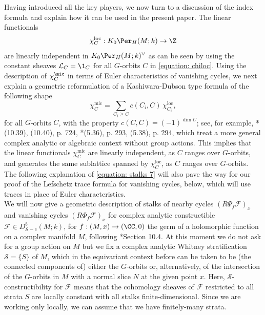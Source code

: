 \documentclass[11pt,letterpaper]{amsart}
\numberwithin{equation}{section}
\begin{document}
Having introduced all the key players, we now turn to a discussion of the index formula and explain how it can be used in the present paper.
The linear functionals $$\chi^{\textrm{loc}}_C : K_0 \Per_{H}(M;k) \to \Z$$ are linearly independent in $K_0 \Per_{H}(M;k)^\vee$  as can be seen by using the constant sheaves $\mathcal{L}_C = \1_{C}$ for all $G$-orbits $C$ in \eqref{equation: chiloc}.
Using the description of $\chi^\mic_C$ in terms of Euler characteristics of vanishing cycles, we next explain a geometric reformulation of a Kashiwara-Dubson type formula of the following shape 
\begin{equation}\label{equation: stalks 7}
\chi^\textrm{mic}_C = \sum_{C_i \geq C} c(C_i,C)\, \chi^\textrm{loc}_{C_i},
\end{equation}
for all $G$-orbits $C$, with the property $c(C,C) = (-1)^{\dim C}$; see, for example, \cite{MS22}*{(10.39), (10.40), p. 724}, \cite{Sch03}*{(5.36), p. 293, (5.38), p. 294}, which treat a more general complex analytic or algebraic context without group actions. 
This implies that the linear functionals $\chi^\textrm{mic}_C$ are linearly independent, as $C$ ranges over $G$-orbits, and generates the same sublattice spanned by $\chi^\textrm{loc}_C$, as $C$ ranges over $G$-orbits.
The following explanation of \ref{equation: stalks 7} will also pave the way for our proof of the Lefschetz trace formula for vanishing cycles, below, which will use traces in place of Euler characteristics.\\


We will now give a geometric description of stalks of nearby cycles $(R\Psi_f \mathcal{F})_x$ and vanishing cycles $(R\Phi_f \mathcal{F})_x$ for complex analytic constructible $\mathcal{F}\in D^b_{\mathscr{S}-c}(M;k)$, for $f: (M,x) \to (\CC,0)$ the germ of a holomorphic function on a complex manifold $M$, following \cite{MS22}*{Section 10.4}.
At this moment we do not ask for a group action on $M$ but 
we fix a complex analytic Whitney stratification $\mathscr{S} = \{ S \}$ of $M$, which in the equivariant context before can be taken to be (the connected components of) either the $G$-orbits or, alternatively, of the intersection of the $G$-orbits in $M$ with a normal slice $N$ at the given point $x$. 
Here, $\mathscr{S}$-constructibility for $\mathcal{F}$ means that the cohomology sheaves of $\mathcal{F}$ restricted to all strata $S$ are locally constant with all stalks finite-dimensional. 
Since we are working only locally, we can assume that we have finitely-many strata. 
\end{document}
